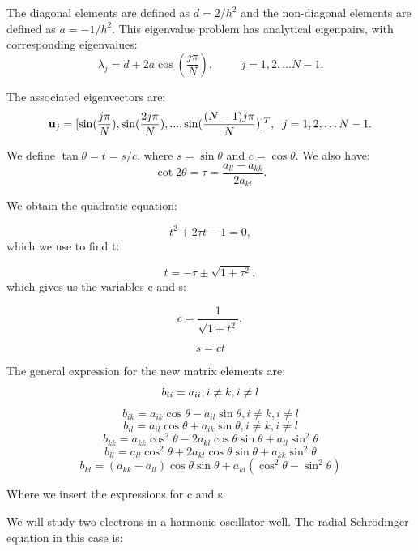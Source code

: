 \documentclass[norsk,a4paper,12pt]{article}
\begin{document}
The diagonal elements are defined as $d=2/h^2$ and the non-diagonal elements are defined as $a=-1/h^2$. This eigenvalue problem has analytical eigenpairs, with corresponding eigenvalues:
\[
\lambda_j = d+2a\cos{(\frac{j\pi}{N})}, \hspace{1cm} j=1,2,\dots N-1.
\]

The associated eigenvectors are:
\[
\mathbf{u}_j = [ \sin(\frac{j\pi}{N}), \sin(\frac{2j\pi}{N}), ..., \sin(\frac{(N-1)j\pi}{N}) ]^T, \hspace{0.2cm} j=1,2,\dots N-1.
\]

We define $\tan\theta = t= s/c$, where $s=\sin\theta$ and $c=\cos\theta$. We also have:
\begin{equation*}\cot 2\theta=\tau = \frac{a_{ll}-a_{kk}}{2a_{kl}}.
\end{equation*}

We obtain the quadratic equation:

\begin{equation*}
t^2+2\tau t-1= 0,
\end{equation*}
 which we use to find t:
 
\begin{equation*}
  t = -\tau \pm \sqrt{1+\tau^2},
\end{equation*}
which gives us the variables c and s:

\begin{equation*}
   c = \frac{1}{\sqrt{1+t^2}},
   \label{eq:c} 
\end{equation*}

\begin{equation*}
  s=ct
   \label{eq:s} 
\end{equation*}


The general expression for the new matrix elements are:
$$
b_{ii}=a_{ii}, i\neq k, i\neq l \\
$$
$$
b_{ik}=a_{ik}\cos \theta - a_{il}\sin \theta, i\neq k, i\neq l
$$
$$
b_{il}=a_{il}\cos\theta+a_{ik}\sin\theta, i\neq k, i\neq l
$$
$$
b_{kk}=a_{kk} \cos^2\theta - 2a_{kl}\cos\theta \sin\theta + a_{ll}\sin^2\theta
$$
$$
b_{ll}=a_{ll}\cos^2\theta+2a_{kl}\cos\theta \sin\theta + a_{kk}\sin^2\theta
$$
\begin{equation}
b_{kl} = (a_{kk}-a_{ll})\cos\theta\sin\theta+a_{kl}(\cos^2\theta-\sin^2\theta)
 \label{eq:Jacob}
 \end{equation}

Where we insert the expressions for c and s.

We will study two electrons in a harmonic oscillator well. The radial Schrödinger equation in this case is:
\end{document}
